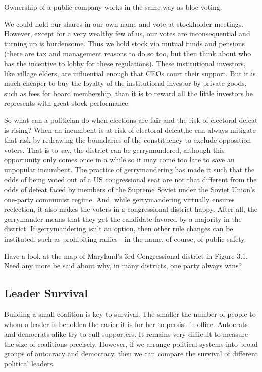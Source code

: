 \documentclass[10pt]{article}
\begin{document}
{\large Ownership of a public company works in the same way as bloc voting.}

{\large We could hold our shares in our own name and vote at stockholder
meetings. However, except for a very wealthy few of us, our votes are
inconsequential and turning up is burdensome. Thus we hold stock via mutual funds
and pensions (there are tax and management reasons to do so too, but then think
about who has the incentive to lobby for these regulations). These institutional
investors, like village elders, are influential enough that CEOs court their
support. But it is much cheaper to buy the loyalty of the institutional investor
by private goods, such as fees for board membership, than it is to reward all the
little investors he represents with great stock performance.}

{\large So what can a politician do when elections are fair and the risk of
electoral defeat is rising? When an incumbent is at risk of electoral defeat,he
can always mitigate that risk by redrawing the boundaries of the constituency to
exclude opposition voters. That is to say, the district can be gerrymandered,
although this opportunity only comes once in a while so it may come too late to
save an unpopular incumbent. The practice of gerrymandering has made it such that
the odds of being voted out of a US congressional seat are not that different
from the odds of defeat faced by members of the Supreme Soviet under the Soviet
Union's one-party communist regime. And, while gerrymandering virtually ensures
reelection, it also makes the voters in a congressional district happy. After
all, the gerrymander means that they get the candidate favored by a majority in
the district. If gerrymandering isn't an option, then other rule changes can be
instituted, such as prohibiting rallies---in the name, of course, of public
safety.}

{\large Have a look at the map of Maryland's 3rd Congressional district in
Figure 3.1. Need any more be said about why, in many districts, one party always
wins?}

\subsection{Leader Survival}

{\large Building a small coalition is key to survival. The smaller the number of
people to whom a leader is beholden the easier it is for her to persist in
office. Autocrats and democrats alike try to cull supporters. It remains very
difficult to measure the size of coalitions precisely. However, if we arrange
political systems into broad groups of autocracy and democracy, then we can
compare the survival of different political leaders.}
\end{document}
